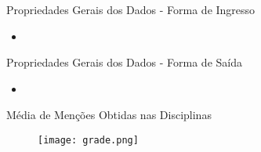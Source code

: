 \begin{frame}{Propriedades Gerais dos Dados - Forma de Ingresso}
    \begin{itemize}[itemsep=3ex]
        \item <gráfico mostrando forma de ingresso>
    \end{itemize}
\end{frame}

\begin{frame}{Propriedades Gerais dos Dados - Forma de Saída}
    \begin{itemize}[itemsep=3ex]
        \item <gráfico mostrando forma de saída>
    \end{itemize}
\end{frame}

\begin{frame}{Média de Menções Obtidas nas Disciplinas}
    \begin{figure}[!ht]
        \centering
        \texttt{[image: grade.png]}
    \end{figure}
\end{frame}


